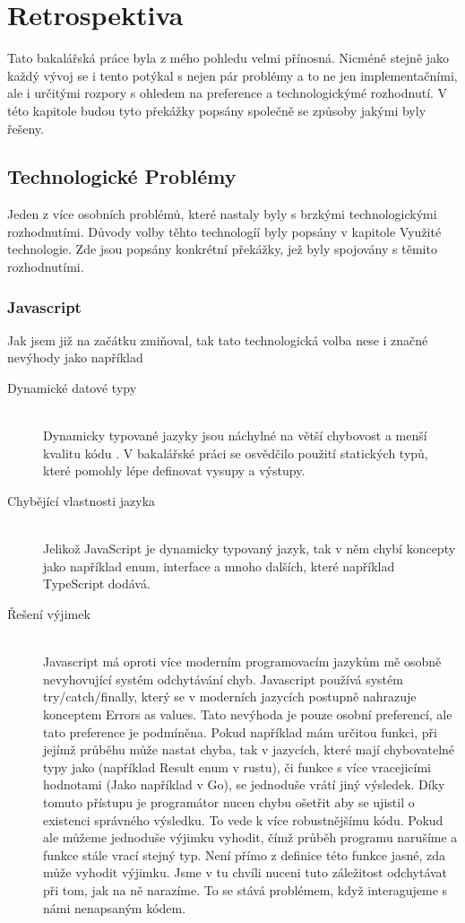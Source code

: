 \chapter{Retrospektiva}

Tato bakalářská práce byla z mého pohledu velmi přínosná. Nicméně stejně jako každý vývoj se i tento potýkal s nejen pár problémy a to ne jen implementačními, ale i určitými rozpory s ohledem na preference a technologickýmé rozhodnutí. V této kapitole budou tyto překážky popsány společně se způsoby jakými byly řešeny.

\section{Technologické Problémy}

Jeden z více osobních problémů, které nastaly byly s brzkými technologickými rozhodnutími. Důvody volby těhto technologíí byly popsány v kapitole Využité technologie. Zde jsou popsány konkrétní překážky, jež byly spojovány s těmito rozhodnutími.

\subsection{Javascript}
Jak jsem již na začátku zmiňoval, tak tato technologická volba nese i značné nevýhody jako například

\begin{description}
  \item[Dynamické datové typy] \hfill \\ Dynamicky typované jazyky jsou náchylné na větší chybovost a menší kvalitu kódu \cite{pang2018programming}. V bakalářské práci se osvědčilo použití statických typů, které pomohly lépe definovat vysupy a výstupy.
  \item[Chybějící vlastnosti jazyka] \hfill \\ Jelikož JavaScript je dynamicky typovaný jazyk, tak v něm chybí koncepty jako například enum, interface a mnoho dalších, které například TypeScript dodává.
  \item[Řešení výjimek] \hfill \\ Javascript má oproti více moderním programovacím jazykům mě osobně nevyhovující systém odchytávání chyb. Javascript používá systém try/catch/finally, který se v moderních jazycích postupně nahrazuje konceptem Errors as values. Tato nevýhoda je pouze osobní preferencí, ale tato preference je podmíněna. Pokud například mám určitou funkci, při jejímž průběhu může nastat chyba, tak v jazycích, které mají chybovatelné typy jako (například Result enum v rustu), či funkce s více vracejicími hodnotami (Jako například v Go), se jednoduše vrátí jiný výsledek. Díky tomuto přístupu je programátor nucen chybu ošetřit aby se ujistil o existenci správného výsledku. To vede k více robustnějšímu kódu. Pokud ale můžeme jednoduše výjimku vyhodit, čímž průběh programu narušíme a funkce stále vrací stejný typ. Není přímo z definice této funkce jasné, zda může vyhodit výjimku. Jsme v tu chvíli nuceni tuto záležitost odchytávat při tom, jak na ně narazíme. To se stává problémem, když interagujeme s námi nenapsaným kódem.
\end{description}

